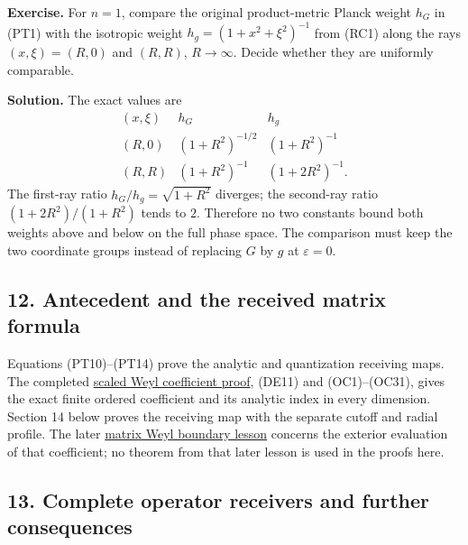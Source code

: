 \documentclass[
  11pt,
]{article}
\begin{document}
\textbf{Exercise.} For \(n=1\), compare the original product-metric
Planck weight \(h_G\) in (PT1) with the isotropic weight
\(h_g=(1+x^2+\xi^2)^{-1}\) from (RC1) along the rays \((x,\xi)=(R,0)\)
and \((R,R)\), \(R\to\infty\). Decide whether they are uniformly
comparable.

\textbf{Solution.} The exact values are \[
 \begin{array}{c|cc}
 (x,\xi)& h_G & h_g\\ \hline
 (R,0)&(1+R^2)^{-1/2}&(1+R^2)^{-1}\\
 (R,R)&(1+R^2)^{-1}&(1+2R^2)^{-1}.
 \end{array}
 \tag{RT3}
\] The first-ray ratio \(h_G/h_g=\sqrt{1+R^2}\) diverges; the second-ray
ratio \((1+2R^2)/(1+R^2)\) tends to \(2\). Therefore no two constants
bound both weights above and below on the full phase space. The
comparison must keep the two coordinate groups instead of replacing
\(G\) by \(g\) at \(\varepsilon=0\).

\subsection{12. Antecedent and the received matrix
formula}\label{antecedent-and-the-received-matrix-formula}

Equations (PT10)--(PT14) prove the analytic and quantization receiving
maps. The completed \href{scaled-weyl-index-degree.pdf}{scaled Weyl
coefficient proof}, (DE11) and (OC1)--(OC31), gives the exact finite
ordered coefficient and its analytic index in every dimension. Section
14 below proves the receiving map with the separate cutoff and radial
profile. The later \href{matrix-weyl-index-theorem.pdf}{matrix Weyl
boundary lesson} concerns the exterior evaluation of that coefficient;
no theorem from that later lesson is used in the proofs here.

\subsection{13. Complete operator receivers and further
consequences}\label{complete-operator-receivers-and-further-consequences}
\end{document}
